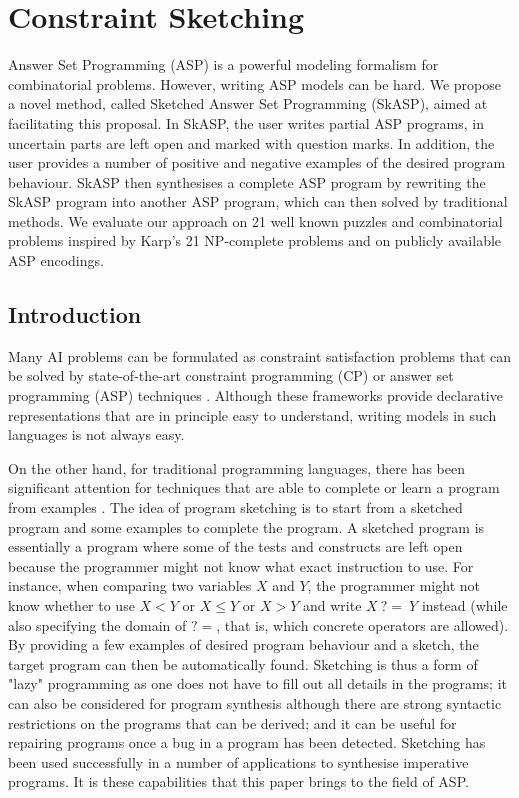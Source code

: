 \chapter{Constraint Sketching}\label{ch:Sketching}
Answer Set Programming (ASP) is a powerful modeling formalism for combinatorial problems. However, writing ASP models can be hard. We propose a novel method, called Sketched Answer Set Programming (SkASP), aimed at facilitating this proposal. In SkASP, the user writes partial ASP programs, in uncertain parts are left open and marked with question marks. In addition, the user provides a number of positive and negative examples of the desired program behaviour.  SkASP then synthesises a complete ASP program by  rewriting the SkASP program into another ASP program, which can then solved by traditional methods.  We evaluate our approach on 21 well known puzzles and combinatorial problems inspired by Karp’s 21 NP-complete problems and on publicly available ASP encodings.

\section{Introduction}\label{sec:intro}
Many AI problems can be formulated as constraint satisfaction problems that can
be solved by state-of-the-art constraint programming (CP)  \parencite{handbookcp} or answer set programming (ASP) techniques \parencite{whatisasp}. 
Although these frameworks provide declarative representations that are in principle
easy to understand, writing models in such languages is not always easy.


On the other hand, for traditional programming languages, there has been significant attention for techniques that are able
to complete \parencite{sketching_phd_thesis} or learn a program from examples \parencite{gulwani2015inductive}. 
The idea of program sketching is to start from a sketched program and some examples
to complete the program. A sketched program is essentially a program where some of the tests and constructs
are left open because the programmer might not know what exact instruction to use.  For instance, 
when comparing two variables $X$ and $Y$, the programmer might not know whether to use $X < Y$ or $X \leq Y$ or $X > Y$ and write 
$X~{?}{=}~Y$ instead (while also specifying the domain of ${?}{=}$, that is, which concrete operators are allowed). 
By providing a few examples of desired program behaviour and a sketch, the target program can then be automatically found.
Sketching is thus a form of "lazy" programming as one does not have to fill out all details in the programs; 
it can also be considered for program synthesis although there are strong syntactic restrictions on 
the programs that can be derived; and it can be useful for repairing programs once a bug in a program has been detected.
Sketching has been used successfully in a number of applications \parencite{sketching_original,sketch_recent,jsketch} to synthesise imperative programs.
It is these capabilities that this paper brings to the field of ASP.


